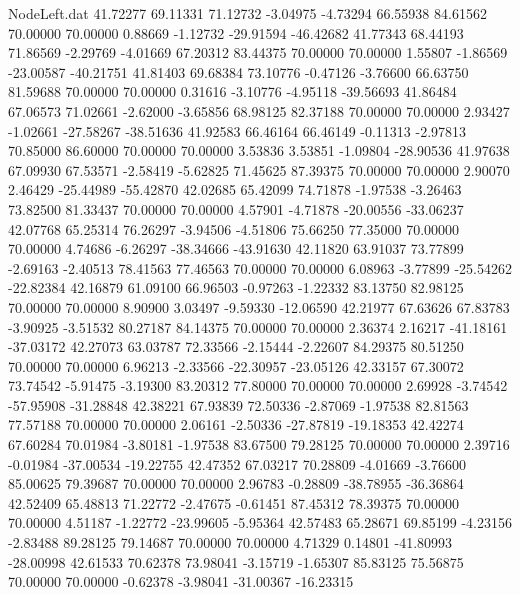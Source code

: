 \begin{filecontents}{NodeLeft.dat}
  41.72277   69.11331   71.12732    -3.04975   -4.73294   66.55938   84.61562   70.00000   70.00000    0.88669   -1.12732  -29.91594  -46.42682
  41.77343   68.44193   71.86569    -2.29769   -4.01669   67.20312   83.44375   70.00000   70.00000    1.55807   -1.86569  -23.00587  -40.21751
  41.81403   69.68384   73.10776    -0.47126   -3.76600   66.63750   81.59688   70.00000   70.00000    0.31616   -3.10776   -4.95118  -39.56693
  41.86484   67.06573   71.02661    -2.62000   -3.65856   68.98125   82.37188   70.00000   70.00000    2.93427   -1.02661  -27.58267  -38.51636
  41.92583   66.46164   66.46149    -0.11313   -2.97813   70.85000   86.60000   70.00000   70.00000    3.53836    3.53851   -1.09804  -28.90536
  41.97638   67.09930   67.53571    -2.58419   -5.62825   71.45625   87.39375   70.00000   70.00000    2.90070    2.46429  -25.44989  -55.42870
  42.02685   65.42099   74.71878    -1.97538   -3.26463   73.82500   81.33437   70.00000   70.00000    4.57901   -4.71878  -20.00556  -33.06237
  42.07768   65.25314   76.26297    -3.94506   -4.51806   75.66250   77.35000   70.00000   70.00000    4.74686   -6.26297  -38.34666  -43.91630
  42.11820   63.91037   73.77899    -2.69163   -2.40513   78.41563   77.46563   70.00000   70.00000    6.08963   -3.77899  -25.54262  -22.82384
  42.16879   61.09100   66.96503    -0.97263   -1.22332   83.13750   82.98125   70.00000   70.00000    8.90900    3.03497   -9.59330  -12.06590
  42.21977   67.63626   67.83783    -3.90925   -3.51532   80.27187   84.14375   70.00000   70.00000    2.36374    2.16217  -41.18161  -37.03172
  42.27073   63.03787   72.33566    -2.15444   -2.22607   84.29375   80.51250   70.00000   70.00000    6.96213   -2.33566  -22.30957  -23.05126
  42.33157   67.30072   73.74542    -5.91475   -3.19300   83.20312   77.80000   70.00000   70.00000    2.69928   -3.74542  -57.95908  -31.28848
  42.38221   67.93839   72.50336    -2.87069   -1.97538   82.81563   77.57188   70.00000   70.00000    2.06161   -2.50336  -27.87819  -19.18353
  42.42274   67.60284   70.01984    -3.80181   -1.97538   83.67500   79.28125   70.00000   70.00000    2.39716   -0.01984  -37.00534  -19.22755
  42.47352   67.03217   70.28809    -4.01669   -3.76600   85.00625   79.39687   70.00000   70.00000    2.96783   -0.28809  -38.78955  -36.36864
  42.52409   65.48813   71.22772    -2.47675   -0.61451   87.45312   78.39375   70.00000   70.00000    4.51187   -1.22772  -23.99605   -5.95364
  42.57483   65.28671   69.85199    -4.23156   -2.83488   89.28125   79.14687   70.00000   70.00000    4.71329    0.14801  -41.80993  -28.00998
  42.61533   70.62378   73.98041    -3.15719   -1.65307   85.83125   75.56875   70.00000   70.00000   -0.62378   -3.98041  -31.00367  -16.23315

\end{filecontents}
